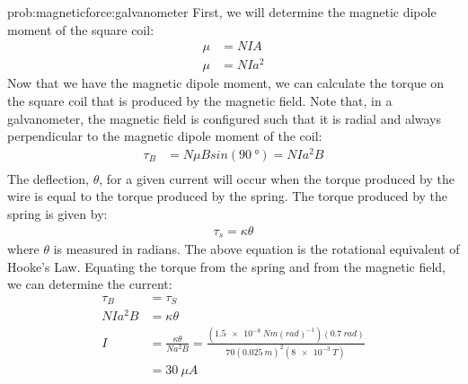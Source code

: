 \begin{solution}{prob:magneticforce:galvanometer}\label{soln:magneticforce:galvanometer}
First, we will determine the magnetic dipole moment of the square coil:
\begin{align*}
\mu &= NIA\\
\mu &=NIa^2
\end{align*}
Now that we have the magnetic dipole moment, we can calculate the torque on the square coil that is produced by the magnetic field. Note that, in a galvanometer, the magnetic field is configured such that it is radial and always perpendicular to the magnetic dipole moment of the coil:
\begin{align*}
\tau_B &= N\mu B sin(\SI{90}{\degree})= NIa^2B\\
\end{align*}
The deflection, $\theta$, for a given current will occur when the torque produced by the wire is equal to the torque produced by the spring. The torque produced by the spring is given by:
\begin{align*}
\tau_s =\kappa \theta
\end{align*} 
where $\theta$ is measured in radians. The above equation is the rotational equivalent of Hooke's Law. Equating the torque from the spring and from the magnetic field, we can determine the current:
\begin{align*}
\tau_B&=\tau_S\\
NIa^2B &= \kappa \theta\\
I &= \frac{\kappa \theta}{Na^2B} = \frac{(\SI{1.5e-8}{Nm(rad)^{-1}}) (\SI{0.7}{rad})}{70(\SI{0.025}{m})^2(\SI{8e-3}{T})}\\
&= \SI{30}{\mu A}
\end{align*}
\end{solution}


